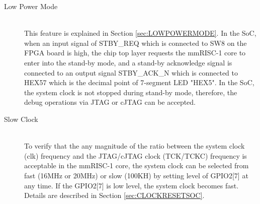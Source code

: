 \begin{description}
    \item[Low Power Mode]\mbox{}\\
    This feature is explained in Section \ref{sec:LOWPOWERMODE}. In the SoC, when an input signal of STBY\_REQ which is connected to SW8 on the FPGA board is high, the chip top layer requests the mmRISC-1 core to enter into the stand-by mode, and a stand-by acknowledge signal is connected to an output signal STBY\_ACK\_N which is connected to HEX57 which is the decimal point of 7-segment LED "HEX5". In the SoC, the system clock is not stopped during stand-by mode, therefore, the debug operations via JTAG or cJTAG can be accepted.

    \item[Slow Clock]\mbox{}\\
    To verify that the any magnitude of the ratio between the system clock (clk) frequency and the JTAG/cJTAG clock (TCK/TCKC) frequency is acceptable in the mmRISC-1 core, the system clock can be selected from fast (16MHz or 20MHz) or slow (100KH) by setting level of GPIO2[7] at any time. If the GPIO2[7] is low level, the system clock becomes fast. Details are described in Section \ref{sec:CLOCKRESETSOC}.


\end{description}


